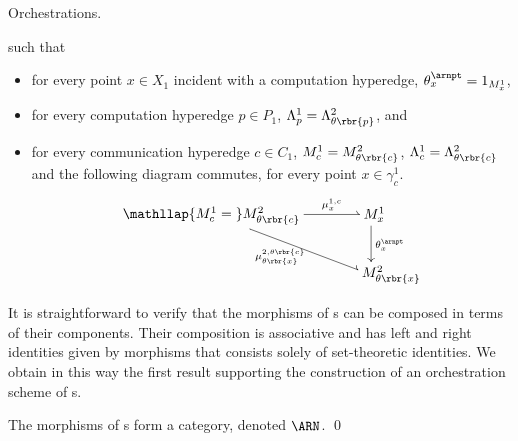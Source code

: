 \documentclass{LMCS}
\begin{document}
\begin{minisection}{Orchestrations.}
\begin{defi}
\begin{itemize}
      \end{itemize}
      such that
      \begin{itemize}

      \item for every point \(x \in X_{1}\) incident with a computation hyperedge, \(\theta^{\arnpt}_{x} = 1_{M^{1}_{x}}\),
        
      \item for every computation hyperedge \(p \in P_{1}\), \(\Lambda^{1}_{p} = \Lambda^{2}_{\theta\rbr{p}}\), and
        
      \item for every communication hyperedge \(c \in C_{1}\), \(M^{1}_{c} = M^{2}_{\theta\rbr{c}}\), \(\Lambda^{1}_{c} = \Lambda^{2}_{\theta\rbr{c}}\) and the following diagram commutes, for every point \(x \in \gamma^{1}_{c}\).
        \[
        \xymatrix{
          {\mathllap{M^{1}_{c} = {}}M^{2}_{\theta\rbr{c}}}
          \ar @{-^{>}} [r] ^-{\mu^{1, c}_{x}}
          \ar @{-^{>}} [dr] _{\mu^{2, \theta\rbr{c}}_{\theta\rbr{x}}}
          & *+[r]{M^{1}_{x}}
          \ar [d] ^{\theta^{\arnpt}_{x}}
          \\
          & *+[r]{M^{2}_{\theta\rbr{x}}}
        }\]

      \end{itemize}
    \end{defi}

\noindent    It is straightforward to verify that the morphisms of s can be composed in terms of their components.
    Their composition is associative and has left and right identities given by morphisms that consists solely of set-theoretic identities.
    We obtain in this way the first result supporting the construction of an orchestration scheme of s.

    \begin{prop}
      The morphisms of s form a category, denoted \(\ARN\).
      \qed
    \end{prop}
    \vspace{-\topsep}
\end{minisection}
\end{document}
